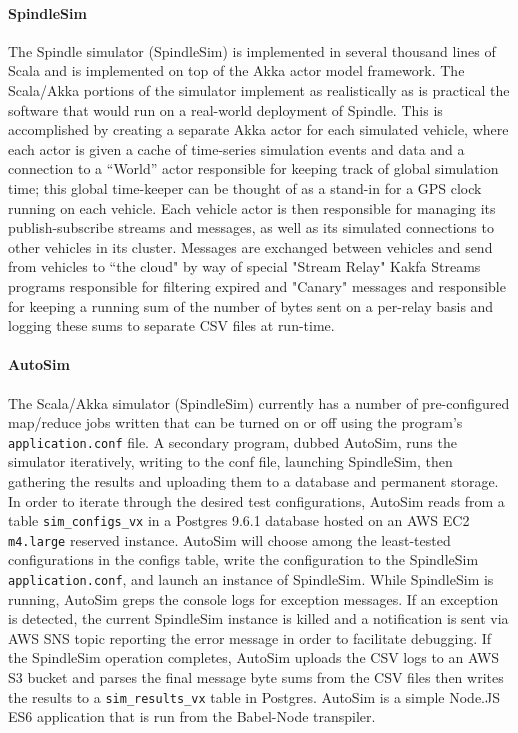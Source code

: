 \documentclass{thesis}
\begin{document}
    \paragraph{SpindleSim}
        The Spindle simulator (SpindleSim) is implemented in several thousand lines of Scala %
        and is implemented on top of the Akka %
        actor model framework. The Scala/Akka portions of the simulator implement as realistically
        as is practical the software that would run on a real-world deployment of Spindle. This is
        accomplished by creating a separate Akka actor for each simulated vehicle, where each actor
        is given a cache of time-series simulation events and data and a connection to a ``World''
        actor responsible for keeping track of global simulation time; this global time-keeper 
        can be thought of as a stand-in for a GPS clock running on each vehicle. Each vehicle
        actor is then responsible for managing its publish-subscribe streams and messages, as well
        as its simulated connections to other vehicles in its cluster. Messages are exchanged between
        vehicles and send from vehicles to ``the cloud" by way of special "Stream Relay" Kakfa Streams
        programs responsible for filtering expired and "Canary" messages %
        and responsible for keeping a running sum of the number of bytes sent on a per-relay basis and logging
        these sums to separate CSV files at run-time.
    \paragraph{AutoSim}
        The Scala/Akka simulator (SpindleSim) currently has a number of pre-configured map/reduce jobs written
        that can be turned on or off using the program's \verb|application.conf| file. A secondary
        program, dubbed AutoSim, runs the simulator iteratively, writing to the conf file, launching
        SpindleSim, then gathering the results and uploading them to a database and permanent storage.
        In order to iterate through the desired test configurations, AutoSim reads from a table \verb|sim_configs_vx| in a 
        Postgres 9.6.1 database hosted on an AWS EC2 \verb|m4.large| reserved instance.
        AutoSim will choose among the least-tested configurations in the configs table, write the configuration to
        the SpindleSim \verb|application.conf|, and launch an instance of SpindleSim. While SpindleSim is running, AutoSim
        greps the console logs for exception messages. If an exception is detected, the current SpindleSim instance is killed
        and a notification is sent via AWS SNS topic reporting the error message in order to facilitate debugging. If the SpindleSim
        operation completes, AutoSim uploads the CSV logs to an AWS S3 bucket and parses the final message byte sums from the CSV
        files then writes the results to a \verb|sim_results_vx| table in Postgres. AutoSim is a simple Node.JS ES6 application
        that is run from the Babel-Node %
        transpiler.
\end{document}
